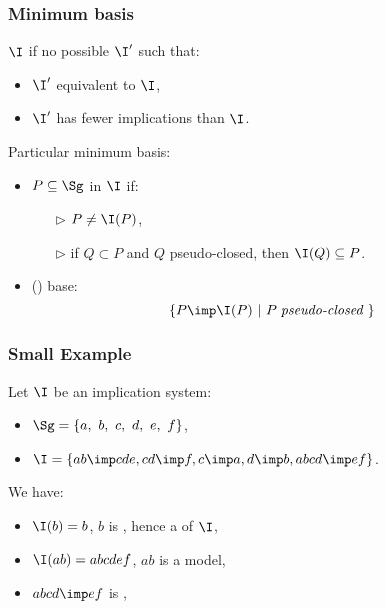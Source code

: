 \begin{frame}
\frametitle{Minimum basis}

$\I$  if no possible $\I'$ such that:
\begin{itemize}
	\item $\I'$ equivalent to $\I$,
	\item $\I'$ has fewer implications than $\I$.
\end{itemize}

\vspace{1.2em}

Particular minimum basis:
\begin{itemize}
	\item $P \subseteq \Sg$  in $\I$ if:
		\begin{itemize}
			\item[\color{belize} $\triangleright$] $P \neq \I(P)$,
			\item[\color{belize} $\triangleright$] if $Q \subset P$ and $Q$ pseudo-closed, then $\I(Q) \subseteq P$.
		\end{itemize}
	\item {} () base:
		\[ \{ P \imp \I(P) \ | \ P \; \textit{pseudo-closed } \} \]
\end{itemize} 

\end{frame}


\begin{frame}
\frametitle{Small Example}

Let $\I$ be an implication system:
\begin{itemize}
	\item $\Sg = \{ a, \ b, \ c, \ d, \ e, \ f \}$,
	\item $\I = \{ ab \imp cde, cd \imp f, c \imp a, d \imp b, abcd \imp ef \}$.
\end{itemize}

\vspace{1.2em}

We have:
\begin{itemize}
	\item $\I(b) = b$, $b$ is , hence a  of $\I$,
	\item $\I(ab) = abcdef$, $ab$ is  a model, \quad 
	\item $abcd \imp ef$ is ,
\end{itemize}

\end{frame}
